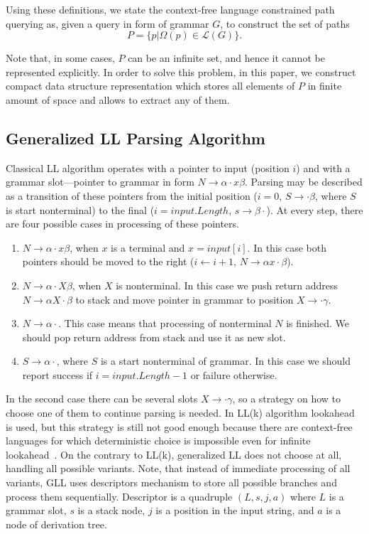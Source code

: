 Using these definitions, we state the context-free language constrained path querying as, given a query in form of grammar $G$, to construct the set of paths $$P=\{p|\Omega(p) \in \mathcal{L}(G)\}.$$

Note that, in some cases, $P$ can be an infinite set, and hence it cannot be represented explicitly. 
In order to solve this problem, in this paper, we construct compact data structure representation which stores all elements of $P$ in finite amount of space and allows to extract any of them.

\subsection{Generalized LL Parsing Algorithm}

Classical LL algorithm operates with a pointer to input (position $i$) and with a grammar slot---pointer to grammar in form $N \rightarrow \alpha \cdot x \beta $.
Parsing may be described as a transition of these pointers from the initial position ($i = 0$, $S \rightarrow \cdot \beta $, where $S$ is start nonterminal) to the final ($i = input.Length$, $s \rightarrow \beta \cdot$).
At every step, there are four possible cases in processing of these pointers. 

\begin{enumerate}
\item $N \rightarrow \alpha \cdot x \beta $, when $x$ is a terminal and $x = input[i]$. In this case both pointers should be moved to the right ($i \leftarrow i + 1$, $N \rightarrow \alpha  x \cdot \beta $).
\item $N \rightarrow \alpha \cdot X \beta $, when $X$ is nonterminal. In this case we push return address $N \rightarrow \alpha X \cdot \beta $ to stack and move pointer in grammar to position $X \rightarrow \cdot \gamma$.\label{itm:2}
\item $N \rightarrow \alpha \cdot $. This case means that processing of nonterminal $N$ is finished. We should pop return address from stack and use it as new slot.\label{itm:3}
\item $S \rightarrow \alpha \cdot $, where $S$ is a start nonterminal of grammar. In this case we should report success if $i = input.Length - 1$ or failure otherwise. 
\end{enumerate}

In the second case there can be several slots $X \rightarrow \cdot \gamma$, so a strategy on how to choose one of them to continue parsing is needed.
In LL(k) algorithm lookahead is used, but this strategy is still not good enough because there are context-free languages for which deterministic choice is impossible even for infinite lookahead~\cite{LLnonLL}.
On the contrary to LL(k), generalized LL does not choose at all, handling all possible variants.
Note, that instead of immediate processing of all variants, GLL uses descriptors mechanism to store all possible branches and process them sequentially. 
Descriptor is a quadruple $(L, s, j, a)$ where $L$ is a grammar slot, $s$ is a stack node, $j$ is a position in the input string, and $a$ is a node of derivation tree. 

